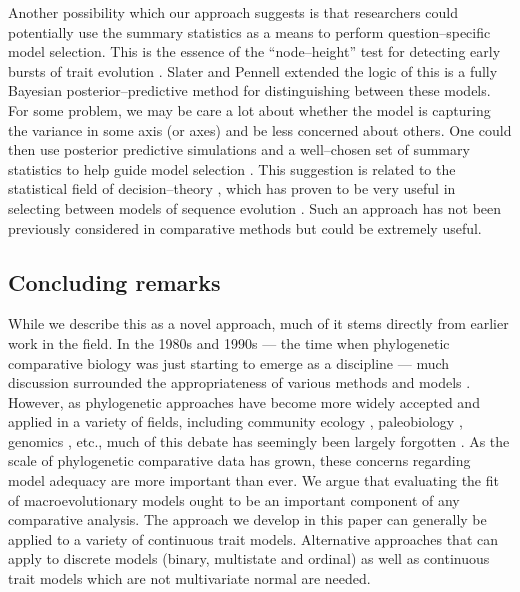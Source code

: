 \documentclass[a4paper,12pt]{article}
\begin{document}
Another possibility which our approach suggests is that researchers could potentially use the summary statistics as a means to perform question--specific model selection. This is the essence of the ``node--height'' test for detecting early bursts of trait evolution \citep{FreckletonHarvey2006}. Slater and Pennell \citep{SlaterPennell} extended the logic of this is a fully Bayesian posterior--predictive method for distinguishing between these models. For some problem, we may be care a lot about whether the model is capturing the variance in some axis (or axes) and be less concerned about others. One could then use posterior predictive simulations and a well--chosen set of summary statistics to help guide model selection \citep{Bollback2002, Lewis2013}. This suggestion is related to the statistical field of decision--theory \citep{Robert2007}, which has proven to be very useful in selecting between models of sequence evolution \citep{Minin2003, SullivanJoyce2005}. Such an approach has not been previously considered in comparative methods but could be extremely useful.

\subsection{Concluding remarks}
While we describe this as a novel approach, much of it stems directly from earlier work in the field. In the 1980s and 1990s --- the time when phylogenetic comparative biology was just starting to emerge as a discipline --- much discussion surrounded the appropriateness of various methods and models \citep{Felsenstein1985, Felsenstein1988, HarveyPagel1991, Garland1992, Pagel1993, Diaz1996, Price1997, Garland1999, GarlandIves2000}. However, as phylogenetic approaches have become more widely accepted and applied in a variety of fields, including community ecology \citep{Webb2002, CB2009}, paleobiology \citep{Hunt2012}, genomics \citep{NielsenMBE}, etc., much of this debate has seemingly been largely forgotten \citep[but see][for recent discussions]{Losos2011, Hansen2012}. As the scale of phylogenetic comparative data has grown, these concerns regarding model adequacy are more important than ever. We argue that evaluating the fit of macroevolutionary models ought to be an important component of any comparative analysis. The approach we develop in this paper can generally be applied to a variety of continuous trait models. Alternative approaches that can apply to discrete models (binary, multistate and ordinal) as well as continuous trait models which are not multivariate normal are needed. 
\end{document}
